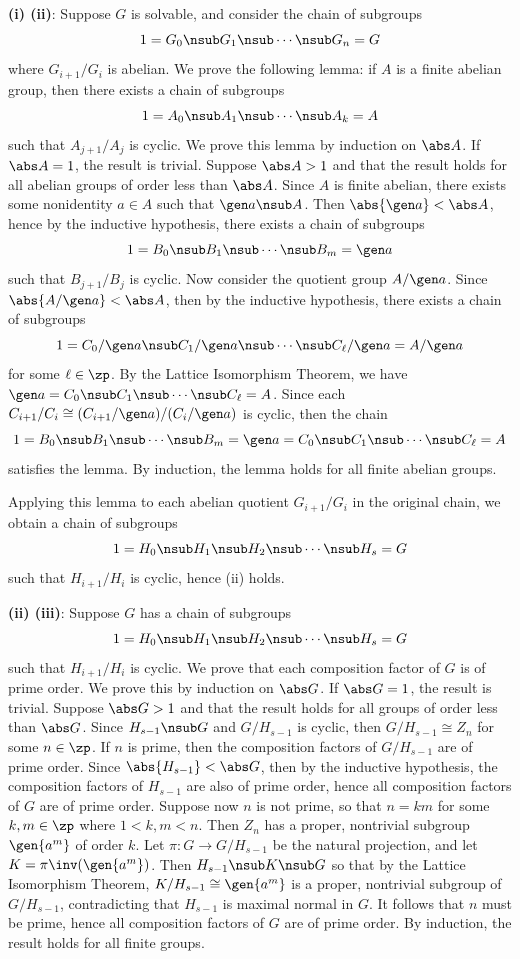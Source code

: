 \begin{sol}
    \textbf{(i) \rightimp (ii)}: Suppose $G$ is solvable, and consider the chain of subgroups
    \[1 = G_0 \nsub G_1 \nsub \cdots \nsub G_n = G\]
    where $G_{i + 1}/G_i$ is abelian. We prove the following lemma: if $A$ is a finite abelian group, then there exists a chain of subgroups
    \[1 = A_0 \nsub A_1 \nsub \cdots \nsub A_k = A\]
    such that $A_{j + 1}/A_j$ is cyclic. We prove this lemma by induction on $\abs A$. If $\abs A = 1$, the result is trivial. Suppose $\abs A > 1$ and that the result holds for all abelian groups of order less than $\abs A$. Since $A$ is finite abelian, there exists some nonidentity $a \in A$ such that $\gen a \nsub A$. Then $\abs{\gen a} < \abs A$, hence by the inductive hypothesis, there exists a chain of subgroups
    \[1 = B_0 \nsub B_1 \nsub \cdots \nsub B_m = \gen a\]
    such that $B_{j + 1}/B_j$ is cyclic. Now consider the quotient group $A/\gen a$. Since $\abs{A/\gen a} < \abs A$, then by the inductive hypothesis, there exists a chain of subgroups
    \[1 = C_0/\gen a \nsub C_1/\gen a \nsub \cdots \nsub C_\ell/\gen a = A/\gen a\]
    for some $\ell \in \zp$. By the Lattice Isomorphism Theorem, we have $\gen a = C_0 \nsub C_1 \nsub \cdots \nsub C_\ell = A$. Since each $C_{i + 1}/C_i \cong (C_{i + 1}/\gen a)/(C_i/\gen a)$ is cyclic, then the chain
    \[1 = B_0 \nsub B_1 \nsub \cdots \nsub B_m = \gen a = C_0 \nsub C_1 \nsub \cdots \nsub C_\ell = A\]
    satisfies the lemma. By induction, the lemma holds for all finite abelian groups. 

    Applying this lemma to each abelian quotient $G_{i + 1}/G_i$ in the original chain, we obtain a chain of subgroups
    \[1 = H_0 \nsub H_1 \nsub H_2 \nsub \cdots \nsub H_s = G\]
    such that $H_{i + 1}/H_i$ is cyclic, hence (ii) holds.

    \textbf{(ii) \rightimp (iii)}: Suppose $G$ has a chain of subgroups
    \[1 = H_0 \nsub H_1 \nsub H_2 \nsub \cdots \nsub H_s = G\]
    such that $H_{i + 1}/H_i$ is cyclic. We prove that each composition factor of $G$ is of prime order. We prove this by induction on $\abs G$. If $\abs G = 1$, the result is trivial. Suppose $\abs G > 1$ and that the result holds for all groups of order less than $\abs G$. Since $H_{s - 1} \nsub G$ and $G/H_{s - 1}$ is cyclic, then $G/H_{s - 1} \cong Z_n$ for some $n \in \zp$. If $n$ is prime, then the composition factors of $G/H_{s - 1}$ are of prime order. Since $\abs{H_{s - 1}} < \abs G$, then by the inductive hypothesis, the composition factors of $H_{s - 1}$ are also of prime order, hence all composition factors of $G$ are of prime order. Suppose now $n$ is not prime, so that $n = km$ for some $k, m \in \zp$ where $1 < k, m < n$. Then $Z_n$ has a proper, nontrivial subgroup $\gen{a^m}$ of order $k$. Let $\pi : G \to G/H_{s - 1}$ be the natural projection, and let $K = \pi\inv(\gen{a^m})$. Then $H_{s - 1} \nsub K \nsub G$ so that by the Lattice Isomorphism Theorem, $K/H_{s - 1} \cong \gen{a^m}$ is a proper, nontrivial subgroup of $G/H_{s - 1}$, contradicting that $H_{s - 1}$ is maximal normal in $G$. It follows that $n$ must be prime, hence all composition factors of $G$ are of prime order. By induction, the result holds for all finite groups.


\end{sol}
